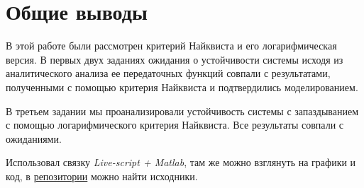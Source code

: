 \newpage
\label{ch:chap6}
\section{Общие выводы}
В этой работе были рассмотрен критерий Найквиста и его логарифмическая версия. В первых двух заданиях ожидания о устойчивости системы исходя из
аналитического анализа ее передаточных функций совпали с результатами, полученными с помощью критерия Найквиста и подтвердились моделированием. 

В третьем задании мы проанализировали устойчивость системы с запаздыванием с помощью логарифмического
критерия Найквиста. Все результаты совпали с ожиданиями.

Использовал связку \textit{Live-script + Matlab}, там же можно взглянуть на графики и код, в \href{https://github.com/GreedlyCore/control_theory_course}{репозитории} можно найти исходники. 
\endinput